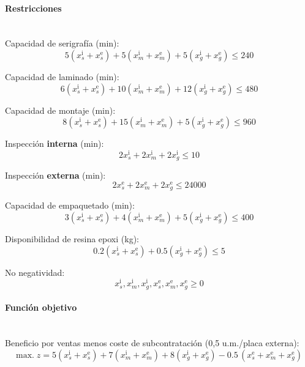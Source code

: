 \paragraph{Restricciones}\mbox{}\\
Capacidad de serigrafía (min):
\begin{equation}
5(x_s^{\mathrm{i}}{+}x_s^{\mathrm{e}}) + 5(x_m^{\mathrm{i}}{+}x_m^{\mathrm{e}}) + 5(x_g^{\mathrm{i}}{+}x_g^{\mathrm{e}}) \le 240
\end{equation}

Capacidad de laminado (min):
\begin{equation}
6(x_s^{\mathrm{i}}{+}x_s^{\mathrm{e}}) + 10(x_m^{\mathrm{i}}{+}x_m^{\mathrm{e}}) + 12(x_g^{\mathrm{i}}{+}x_g^{\mathrm{e}}) \le 480
\end{equation}

Capacidad de montaje (min):
\begin{equation}
8(x_s^{\mathrm{i}}{+}x_s^{\mathrm{e}}) + 15(x_m^{\mathrm{i}}{+}x_m^{\mathrm{e}}) + 5(x_g^{\mathrm{i}}{+}x_g^{\mathrm{e}}) \le 960
\end{equation}

Inspección \textbf{interna} (min):
\begin{equation}
2x_s^{\mathrm{i}} + 2x_m^{\mathrm{i}} + 2x_g^{\mathrm{i}} \le 10
\end{equation}

Inspección \textbf{externa} (min):
\begin{equation}
2x_s^{\mathrm{e}} + 2x_m^{\mathrm{e}} + 2x_g^{\mathrm{e}} \le 24000
\end{equation}

Capacidad de empaquetado (min):
\begin{equation}
3(x_s^{\mathrm{i}}{+}x_s^{\mathrm{e}}) + 4(x_m^{\mathrm{i}}{+}x_m^{\mathrm{e}}) + 5(x_g^{\mathrm{i}}{+}x_g^{\mathrm{e}}) \le 400
\end{equation}

Disponibilidad de resina epoxi (kg):
\begin{equation}
0.2(x_s^{\mathrm{i}}{+}x_s^{\mathrm{e}}) + 0.5(x_g^{\mathrm{i}}{+}x_g^{\mathrm{e}}) \le 5
\end{equation}

No negatividad:
\begin{equation}
x_s^{\mathrm{i}},x_m^{\mathrm{i}},x_g^{\mathrm{i}},x_s^{\mathrm{e}},x_m^{\mathrm{e}},x_g^{\mathrm{e}} \ge 0
\end{equation}

\paragraph{Función objetivo}\mbox{}\\
Beneficio por ventas menos coste de subcontratación (0,5 u.m./placa externa):
\begin{equation}
\mbox{max.}\; z = 5(x_s^{\mathrm{i}}{+}x_s^{\mathrm{e}}) + 7(x_m^{\mathrm{i}}{+}x_m^{\mathrm{e}}) + 8(x_g^{\mathrm{i}}{+}x_g^{\mathrm{e}})
- 0.5\,(x_s^{\mathrm{e}} + x_m^{\mathrm{e}} + x_g^{\mathrm{e}})
\end{equation}

